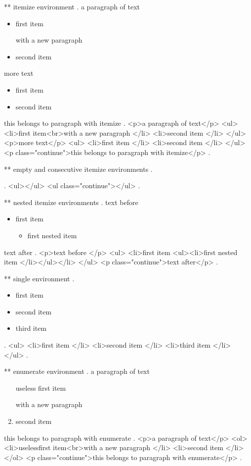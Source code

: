 ** itemize environment
.
a paragraph of text

\begin{itemize}
    \item first item

        with a new paragraph
    \item second item
\end{itemize}

more text

\begin{itemize}
    \item first item
    \item second item
\end{itemize}
this belongs to paragraph with itemize
.
<p>a paragraph of text</p>
<ul>
<li>ﬁrst item<br>with a new paragraph </li>
<li>second item </li>
</ul>
<p>more text</p>
<ul>
<li>ﬁrst item </li>
<li>second item </li>
</ul>
<p class="continue">this belongs to paragraph with itemize</p>
.


** empty and consecutive itemize environments
.
\begin{itemize}
\end{itemize}
\begin{itemize}
\end{itemize}
.
<ul></ul>
<ul class="continue"></ul>
.


** nested itemize environments
.
text before
\begin{itemize}
    \item first item
        \begin{itemize}
            \item first nested item
        \end{itemize}
\end{itemize}
text after
.
<p>text before </p>
<ul>
<li>ﬁrst item <ul><li>ﬁrst nested item </li></ul></li>
</ul>
<p class="continue">text after</p>
.


** single environment
.
\begin{itemize}
    \item first item
    \item second item
    \item third item
\end{itemize}
.
<ul>
<li>ﬁrst item </li>
<li>second item </li>
<li>third item </li>
</ul>
.



** enumerate environment
.
a paragraph of text

\begin{enumerate}
    \item[useless] first item

        with a new paragraph
    \item second item
\end{enumerate}
this belongs to paragraph with enumerate
.
<p>a paragraph of text</p>
<ol>
<li>uselessﬁrst item<br>with a new paragraph </li>
<li>second item </li>
</ol>
<p class="continue">this belongs to paragraph with enumerate</p>
.



